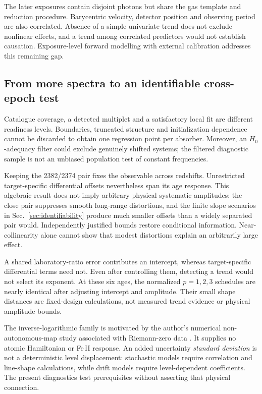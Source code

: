 The later exposures contain disjoint photons but share the gas template and reduction procedure. Barycentric velocity, detector position and observing period are also correlated. Absence of a simple univariate trend does not exclude nonlinear effects, and a trend among correlated predictors would not establish causation. Exposure-level forward modelling with external calibration addresses this remaining gap.

\subsection{From more spectra to an identifiable cross-epoch test}
Catalogue coverage, a detected multiplet and a satisfactory local fit are different readiness levels. Boundaries, truncated structure and initialization dependence cannot be discarded to obtain one regression point per absorber. Moreover, an $H_0$-adequacy filter could exclude genuinely shifted systems; the filtered diagnostic sample is not an unbiased population test of constant frequencies.

Keeping the 2382/2374 pair fixes the observable across redshifts. Unrestricted target-specific differential offsets nevertheless span its age response. This algebraic result does not imply arbitrary physical systematic amplitudes: the close pair suppresses smooth long-range distortions, and the finite slope scenarios in Sec.~\ref{sec:identifiability} produce much smaller offsets than a widely separated pair would. Independently justified bounds restore conditional information. Near-collinearity alone cannot show that modest distortions explain an arbitrarily large effect.

A shared laboratory-ratio error contributes an intercept, whereas target-specific differential terms need not. Even after controlling them, detecting a trend would not select its exponent. At these six ages, the normalized $p=1,2,3$ schedules are nearly identical after adjusting intercept and amplitude. Their small shape distances are fixed-design calculations, not measured trend evidence or physical amplitude bounds.

The inverse-logarithmic family is motivated by the author's numerical non-autonomous-map study associated with Riemann-zero data \citep{Wang2026Spectral}. It supplies no atomic Hamiltonian or Fe\,II response. An added uncertainty \emph{standard deviation} is not a deterministic level displacement: stochastic models require correlation and line-shape calculations, while drift models require level-dependent coefficients. The present diagnostics test prerequisites without asserting that physical connection.

